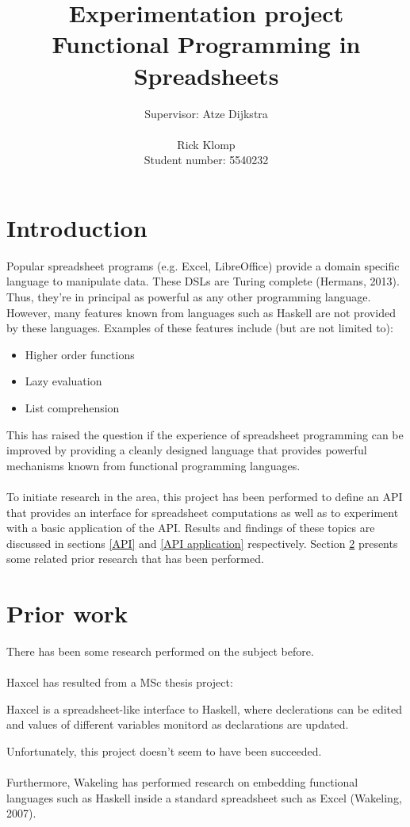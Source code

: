 \documentclass[10pt,a4paper]{article}
\begin{document}
\author{Supervisor: Atze Dijkstra\\\\Rick Klomp\\Student number: 5540232}
\title{Experimentation project\\Functional Programming in Spreadsheets}
\maketitle
\pagebreak

\section{Introduction}
Popular spreadsheet programs (e.g. Excel, LibreOffice) provide a
domain specific language to manipulate data. These DSLs are Turing complete (Hermans, 2013). Thus,
they're in principal as powerful as any other programming language.
However, many features known from languages such as Haskell are not provided by these languages.
Examples of these features include (but are not limited to):
\begin{itemize}
\item Higher order functions
\item Lazy evaluation
\item List comprehension
\end{itemize}
This has raised the question if the experience of spreadsheet programming can be improved by
providing a cleanly designed language that provides powerful mechanisms known from functional
programming languages.
\\\\
To initiate research in the area, this project has been performed to define an API that provides
an interface for spreadsheet computations as well as to experiment with a basic application of
the API. Results and findings of these topics are discussed in sections \ref{API} and
\ref{API application} respectively. Section \ref{Prior work} presents some related prior research
that has been performed.

\section{Prior work}
\label{Prior work}
There has been some research performed on the subject before.
\\\\
Haxcel has resulted from a MSc thesis project:
\begin{displayquote}[Lisper, 2005]
Haxcel is a spreadsheet-like interface to Haskell, where declerations can be edited and values of
different variables monitord as declarations are updated.
\end{displayquote}
Unfortunately, this project doesn't seem to have been succeeded.
\\\\
Furthermore, Wakeling has performed research on embedding functional languages such as Haskell
inside a standard spreadsheet such as Excel (Wakeling, 2007).
\end{document}
